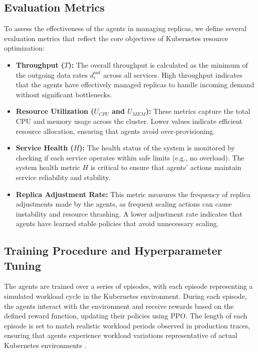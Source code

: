 \documentclass[conference]{IEEEtran}
\begin{document}
\subsection{Evaluation Metrics}

To assess the effectiveness of the agents in managing replicas, we define several evaluation metrics that reflect the core objectives of Kubernetes resource optimization:
\begin{itemize}
    \item \textbf{Throughput ($T$):} The overall throughput is calculated as the minimum of the outgoing data rates $d_i^{out}$ across all services. High throughput indicates that the agents have effectively managed replicas to handle incoming demand without significant bottlenecks.
    \item \textbf{Resource Utilization ($U_{CPU}$ and $U_{MEM}$):} These metrics capture the total CPU and memory usage across the cluster. Lower values indicate efficient resource allocation, ensuring that agents avoid over-provisioning.
    \item \textbf{Service Health ($H$):} The health status of the system is monitored by checking if each service operates within safe limits (e.g., no overload). The system health metric $H$ is critical to ensure that agents' actions maintain service reliability and stability.
    \item \textbf{Replica Adjustment Rate:} This metric measures the frequency of replica adjustments made by the agents, as frequent scaling actions can cause instability and resource thrashing. A lower adjustment rate indicates that agents have learned stable policies that avoid unnecessary scaling.
\end{itemize}

\subsection{Training Procedure and Hyperparameter Tuning}

The agents are trained over a series of episodes, with each episode representing a simulated workload cycle in the Kubernetes environment. During each episode, the agents interact with the environment and receive rewards based on the defined reward function, updating their policies using PPO. The length of each episode is set to match realistic workload periods observed in production traces, ensuring that agents experience workload variations representative of actual Kubernetes environments \cite{nguyen_sim2reality}.
\end{document}
